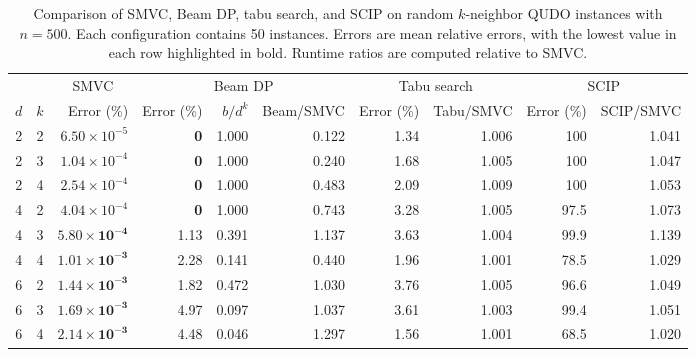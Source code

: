 \begin{table}[t]
    \centering
    \caption{
    Comparison of SMVC, Beam DP, tabu search, and SCIP on random
    $k$-neighbor QUDO instances with $n=500$. Each configuration
    contains 50 instances. Errors are mean relative errors, with the
    lowest value in each row highlighted in bold. Runtime ratios are
    computed relative to SMVC.
    }
    \label{tab:n500-method-comparison}
    \small
    \setlength{\tabcolsep}{4pt}
    \renewcommand{\arraystretch}{1.15}

    \begin{tabular*}{\textwidth}{
        @{\extracolsep{\fill}}ccrrrrrrrr@{}
    }
        \toprule
        & &
        \multicolumn{1}{c}{SMVC} &
        \multicolumn{3}{c}{Beam DP} &
        \multicolumn{2}{c}{Tabu search} &
        \multicolumn{2}{c}{SCIP} \\
        \cmidrule(lr){3-3}
        \cmidrule(lr){4-6}
        \cmidrule(lr){7-8}
        \cmidrule(l){9-10}

        $d$ & $k$ &
        Error (\%) & Error (\%) & $b/d^k$ & Beam/SMVC &
        Error (\%) & Tabu/SMVC & Error (\%) & SCIP/SMVC \\
        \midrule
        2 & 2 & $6.50\times10^{-5}$ & \textbf{0} & 1.000 & 0.122 & 1.34 & 1.006 & 100 & 1.041 \\
        2 & 3 & $1.04\times10^{-4}$ & \textbf{0} & 1.000 & 0.240 & 1.68 & 1.005 & 100 & 1.047 \\
        2 & 4 & $2.54\times10^{-4}$ & \textbf{0} & 1.000 & 0.483 & 2.09 & 1.009 & 100 & 1.053 \\
        \midrule
        4 & 2 & $4.04\times10^{-4}$ & \textbf{0} & 1.000 & 0.743 & 3.28 & 1.005 & 97.5 & 1.073 \\
        4 & 3 & $\mathbf{5.80\times10^{-4}}$ & 1.13 & 0.391 & 1.137 & 3.63 & 1.004 & 99.9 & 1.139 \\
        4 & 4 & $\mathbf{1.01\times10^{-3}}$ & 2.28 & 0.141 & 0.440 & 1.96 & 1.001 & 78.5 & 1.029 \\
        \midrule
        6 & 2 & $\mathbf{1.44\times10^{-3}}$ & 1.82 & 0.472 & 1.030 & 3.76 & 1.005 & 96.6 & 1.049 \\
        6 & 3 & $\mathbf{1.69\times10^{-3}}$ & 4.97 & 0.097 & 1.037 & 3.61 & 1.003 & 99.4 & 1.051 \\
        6 & 4 & $\mathbf{2.14\times10^{-3}}$ & 4.48 & 0.046 & 1.297 & 1.56 & 1.001 & 68.5 & 1.020 \\
        \bottomrule
    \end{tabular*}
\end{table}
